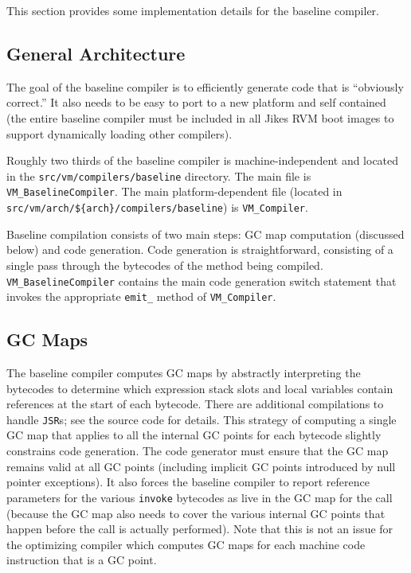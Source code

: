 This section provides some implementation details for the baseline
compiler. 

\subsection{General Architecture}
The goal of the baseline compiler is to efficiently generate code that
is ``obviously correct.'' It also needs to be easy to port to a new
platform and self contained (the entire baseline compiler must be
included in all Jikes RVM boot images to support dynamically loading
other compilers). 

Roughly two thirds of the baseline compiler is machine-independent and
located in the {\tt src\-/\-vm\-/\-com\-pi\-lers\-/\-base\-line} directory. The main file is
{\tt VM\_BaselineCompiler}. The main platform-dependent file (located
in {\tt src\-/\-vm\-/\-arch\-/\-\$\{arch\}\-/\-com\-pi\-lers\-/\-base\-line}) is {\tt VM\_\-Com\-pi\-ler}. 

Baseline compilation consists of two main steps: GC map computation
(discussed below) and code generation.  Code generation is
straightforward, consisting of a single pass through the
bytecodes of the method being compiled. {\tt VM\_BaselineCompiler}
contains the main code generation switch statement that invokes the
appropriate \texttt{emit\_} method of {\tt VM\_Compiler}. 

\subsection{GC Maps}
The baseline compiler computes GC maps by abstractly interpreting the
bytecodes to determine which expression stack slots and local
variables contain references at the start of each bytecode. There are
additional compilations to handle {\tt JSR}s; see the source code for
details. This strategy of computing a single GC map that applies to
all the internal GC points for each bytecode slightly constrains code
generation. The code generator must ensure that the GC map remains
valid at all GC points (including implicit GC points introduced by
null pointer exceptions). It also forces the baseline compiler to
report reference parameters for the various {\tt invoke} bytecodes as
live in the GC map for the call (because the GC map also needs to
cover the various internal GC points that happen before the call is
actually performed). Note that this is not an issue for the optimizing
compiler which computes GC maps for each machine code instruction that
is a GC point. 

